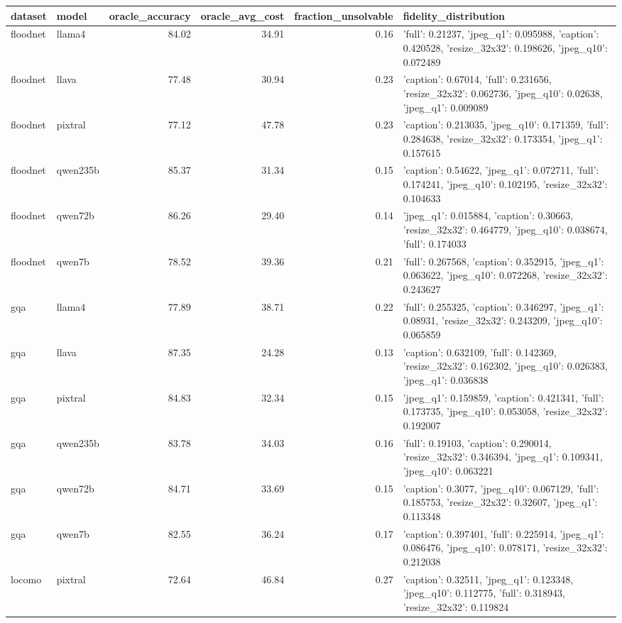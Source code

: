 \begin{tabular}{llrrrl}
\toprule
dataset & model & oracle_accuracy & oracle_avg_cost & fraction_unsolvable & fidelity_distribution \\
\midrule
floodnet & llama4 & 84.02 & 34.91 & 0.16 & {'full': 0.21237, 'jpeg_q1': 0.095988, 'caption': 0.420528, 'resize_32x32': 0.198626, 'jpeg_q10': 0.072489} \\
floodnet & llava & 77.48 & 30.94 & 0.23 & {'caption': 0.67014, 'full': 0.231656, 'resize_32x32': 0.062736, 'jpeg_q10': 0.02638, 'jpeg_q1': 0.009089} \\
floodnet & pixtral & 77.12 & 47.78 & 0.23 & {'caption': 0.213035, 'jpeg_q10': 0.171359, 'full': 0.284638, 'resize_32x32': 0.173354, 'jpeg_q1': 0.157615} \\
floodnet & qwen235b & 85.37 & 31.34 & 0.15 & {'caption': 0.54622, 'jpeg_q1': 0.072711, 'full': 0.174241, 'jpeg_q10': 0.102195, 'resize_32x32': 0.104633} \\
floodnet & qwen72b & 86.26 & 29.40 & 0.14 & {'jpeg_q1': 0.015884, 'caption': 0.30663, 'resize_32x32': 0.464779, 'jpeg_q10': 0.038674, 'full': 0.174033} \\
floodnet & qwen7b & 78.52 & 39.36 & 0.21 & {'full': 0.267568, 'caption': 0.352915, 'jpeg_q1': 0.063622, 'jpeg_q10': 0.072268, 'resize_32x32': 0.243627} \\
gqa & llama4 & 77.89 & 38.71 & 0.22 & {'full': 0.255325, 'caption': 0.346297, 'jpeg_q1': 0.08931, 'resize_32x32': 0.243209, 'jpeg_q10': 0.065859} \\
gqa & llava & 87.35 & 24.28 & 0.13 & {'caption': 0.632109, 'full': 0.142369, 'resize_32x32': 0.162302, 'jpeg_q10': 0.026383, 'jpeg_q1': 0.036838} \\
gqa & pixtral & 84.83 & 32.34 & 0.15 & {'jpeg_q1': 0.159859, 'caption': 0.421341, 'full': 0.173735, 'jpeg_q10': 0.053058, 'resize_32x32': 0.192007} \\
gqa & qwen235b & 83.78 & 34.03 & 0.16 & {'full': 0.19103, 'caption': 0.290014, 'resize_32x32': 0.346394, 'jpeg_q1': 0.109341, 'jpeg_q10': 0.063221} \\
gqa & qwen72b & 84.71 & 33.69 & 0.15 & {'caption': 0.3077, 'jpeg_q10': 0.067129, 'full': 0.185753, 'resize_32x32': 0.32607, 'jpeg_q1': 0.113348} \\
gqa & qwen7b & 82.55 & 36.24 & 0.17 & {'caption': 0.397401, 'full': 0.225914, 'jpeg_q1': 0.086476, 'jpeg_q10': 0.078171, 'resize_32x32': 0.212038} \\
locomo & pixtral & 72.64 & 46.84 & 0.27 & {'caption': 0.32511, 'jpeg_q1': 0.123348, 'jpeg_q10': 0.112775, 'full': 0.318943, 'resize_32x32': 0.119824} \\

\end{tabular}
